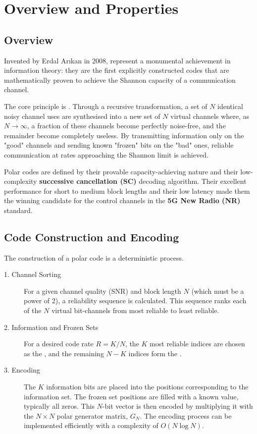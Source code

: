 \section{Overview and Properties}

\subsection{Overview}

Invented by Erdal Arıkan in 2008,  represent a monumental achievement in information theory: they are the first explicitly constructed codes that are mathematically proven to achieve the Shannon capacity of a communication channel.

The core principle is . Through a recursive transformation, a set of $N$ identical noisy channel uses are synthesised into a new set of $N$ virtual channels where, as $N \to \infty$, a fraction of these channels become perfectly noise-free, and the remainder become completely useless. By transmitting information only on the "good" channels and sending known "frozen" bits on the "bad" ones, reliable communication at rates approaching the Shannon limit is achieved.

\begin{keyconcept}
    Polar codes are defined by their provable capacity-achieving nature and their low-complexity \textbf{successive cancellation (SC)} decoding algorithm. Their excellent performance for short to medium block lengths and their low latency made them the winning candidate for the control channels in the \textbf{5G New Radio (NR)} standard.
\end{keyconcept}


\subsection{Code Construction and Encoding}

The construction of a polar code is a deterministic process.
\begin{description}
    \item[1. Channel Sorting] For a given channel quality (SNR) and block length $N$ (which must be a power of 2), a reliability sequence is calculated. This sequence ranks each of the $N$ virtual bit-channels from most reliable to least reliable.
    \item[2. Information and Frozen Sets] For a desired code rate $R=K/N$, the $K$ most reliable indices are chosen as the , and the remaining $N-K$ indices form the .
    \item[3. Encoding] The $K$ information bits are placed into the positions corresponding to the information set. The frozen set positions are filled with a known value, typically all zeros. This $N$-bit vector is then encoded by multiplying it with the $N \times N$ polar generator matrix, $G_N$. The encoding process can be implemented efficiently with a complexity of $O(N \log N)$.
\end{description}


